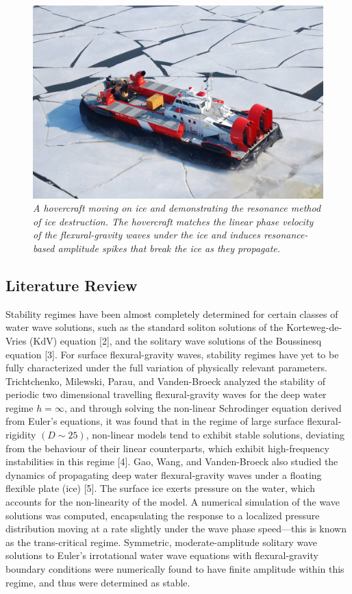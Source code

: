 \documentclass{article}
\begin{document}
\begin{figure}[hbt!]
\centering
\includegraphics[scale = .4]{Hovercraft.jpg}
\caption{ \emph{A hovercraft moving on ice and demonstrating the resonance method of ice destruction. The hovercraft matches the linear phase velocity of the flexural-gravity waves under the ice and induces resonance-based amplitude spikes that break the ice as they propagate.}} \label{Hovercraft}
\end{figure}



\subsection{Literature Review}

Stability regimes have been almost completely determined for certain classes of water wave solutions, such as the standard soliton solutions of the Korteweg-de-Vries (KdV) equation [2], and the solitary wave solutions of the Boussinesq equation [3]. For surface flexural-gravity waves, stability regimes have yet to be fully characterized under the full variation of physically relevant parameters. Trichtchenko, Milewski, Parau, and Vanden-Broeck analyzed the stability of periodic two dimensional travelling flexural-gravity waves for the deep water regime \(h = \infty\), and through solving the non-linear Schrodinger equation derived from Euler’s equations, it was found that in the regime of large surface flexural-rigidity \((D \sim 25)\), non-linear models tend to exhibit stable solutions, deviating from the behaviour of their linear counterparts, which exhibit high-frequency instabilities in this regime [4]. Gao, Wang, and Vanden-Broeck also studied the dynamics of propagating deep water flexural-gravity waves under a floating flexible plate (ice) [5]. The surface ice exerts pressure on the water, which accounts for the non-linearity of the model. A numerical simulation of the wave solutions was computed, encapsulating the response to a localized pressure distribution moving at a rate slightly under the wave phase speed—this is known as the trans-critical regime. Symmetric, moderate-amplitude solitary wave solutions to Euler’s irrotational water wave equations with flexural-gravity boundary conditions were numerically found to have finite amplitude within this regime, and thus were determined as stable. 
\\
\end{document}
